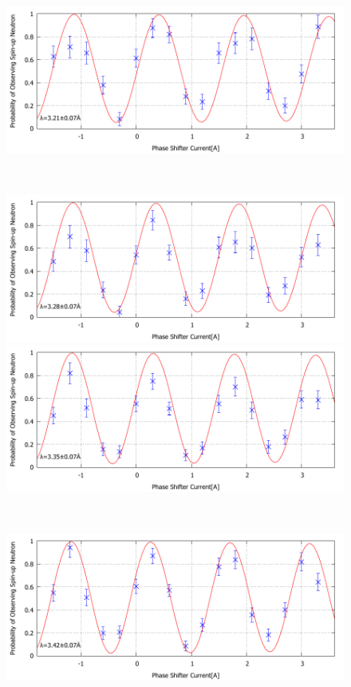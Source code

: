 \begin{figure}[H]
\begin{minipage}{0.5\hsize}
\includegraphics[width=\hsize]{discussion/BG/IT_eb_450.pdf}
\end{minipage}\\
\begin{minipage}{0.5\hsize}
\includegraphics[width=\hsize]{discussion/BG/IT_eb_460.pdf}
\end{minipage}
\begin{minipage}{0.5\hsize}
\includegraphics[width=\hsize]{discussion/BG/IT_eb_470.pdf}
\end{minipage}\\
\begin{minipage}{0.5\hsize}
\includegraphics[width=\hsize]{discussion/BG/IT_eb_480.pdf}

\end{minipage}
\end{figure}
